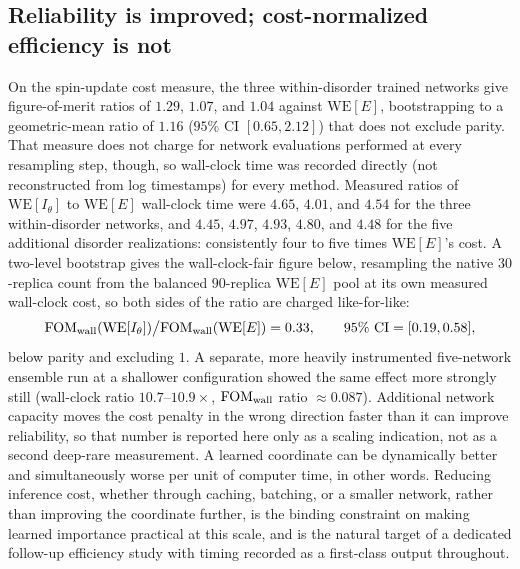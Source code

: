\documentclass[a4paper,fleqn]{cas-sc}
\newcommand{\WE}{\mathrm{WE}}
\newcommand{\FOM}{\mathrm{FOM}}
\begin{document}
\subsection{Reliability is improved; cost-normalized efficiency is not}\label{sec:costdisc}
On the spin-update cost measure, the three within-disorder trained networks give
figure-of-merit ratios of $1.29$, $1.07$, and $1.04$ against $\WE[E]$, bootstrapping to a
geometric-mean ratio of $1.16$ ($95\%$ CI $[0.65,2.12]$) that does not exclude parity. That
measure does not charge for network evaluations performed at every resampling step, though, so
wall-clock time was recorded directly (not reconstructed from log timestamps) for every
method. Measured ratios of $\WE[I_\theta]$ to $\WE[E]$ wall-clock time were $4.65$, $4.01$, and
$4.54$ for the three within-disorder networks, and $4.45$, $4.97$, $4.93$, $4.80$, and $4.48$
for the five additional disorder realizations: consistently four to five times $\WE[E]$'s
cost. A two-level bootstrap
gives the wall-clock-fair figure below, resampling the native $30$-replica count from the
balanced $90$-replica $\WE[E]$ pool at its own measured wall-clock cost, so both sides of the
ratio are charged like-for-like:
\begin{equation}
\FOM_{\rm wall}(\WE[I_\theta])\big/\FOM_{\rm wall}(\WE[E]) = 0.33,
\qquad 95\%\ \mathrm{CI}=[0.19,0.58],
\label{eq:fomwall}
\end{equation}
below parity and excluding $1$. A separate, more heavily instrumented five-network ensemble
run at a shallower configuration showed the same effect more strongly still (wall-clock ratio
$10.7$--$10.9\times$, $\FOM_{\rm wall}$ ratio $\approx0.087$). Additional network capacity
moves the cost penalty in the wrong direction faster than it can improve reliability, so that
number is reported here only as a scaling indication, not as a second deep-rare measurement. A
learned coordinate can be dynamically better and simultaneously worse per unit of computer
time, in other words. Reducing inference cost, whether through caching, batching, or a smaller
network, rather than improving the coordinate further, is the binding constraint on making
learned importance practical at this scale, and is the natural target of a dedicated
follow-up efficiency study with timing recorded as a first-class output throughout.
\end{document}
